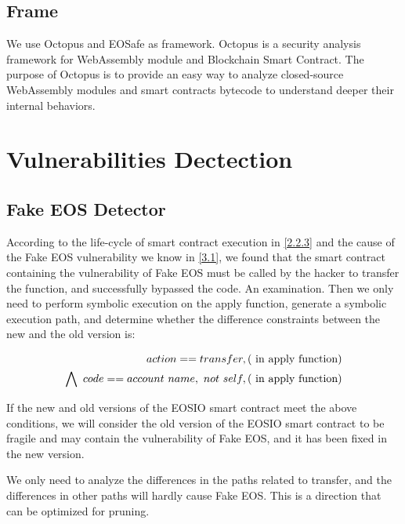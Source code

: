 \documentclass[a4paper, 10pt, conference, twocolumn]{ieeeconf}       %
\begin{document}
\subsection{Frame}
We use Octopus and EOSafe as framework.
Octopus is a security analysis framework for WebAssembly module and Blockchain Smart Contract.
The purpose of Octopus is to provide an easy way to analyze closed-source WebAssembly modules and smart contracts bytecode to understand deeper their internal behaviors.


\section{Vulnerabilities Dectection}


\subsection{Fake EOS Detector}
According to the life-cycle of smart contract execution in \ref{2.2.3} and the cause of the Fake EOS vulnerability we know in \ref{3.1},
we found that the smart contract containing the vulnerability of Fake EOS must be called by the hacker to transfer the function,
and successfully bypassed the code. An examination.
Then we only need to perform symbolic execution on the apply function,
generate a symbolic execution path,
and determine whether the difference constraints between the new and the old version is:

\begin{equation}
\begin{aligned}
action == transfer,(\rm~in~apply~function) \\ \bigwedge~code == account~name,~not~self,(\rm~in~apply~function) 
\end{aligned}
\end{equation}

If the new and old versions of the EOSIO smart contract meet the above conditions,
we will consider the old version of the EOSIO smart contract to be fragile and may contain the vulnerability of Fake EOS,
and it has been fixed in the new version.

We only need to analyze the differences in the paths related to transfer,
and the differences in other paths will hardly cause Fake EOS.
This is a direction that can be optimized for pruning.
\end{document}
